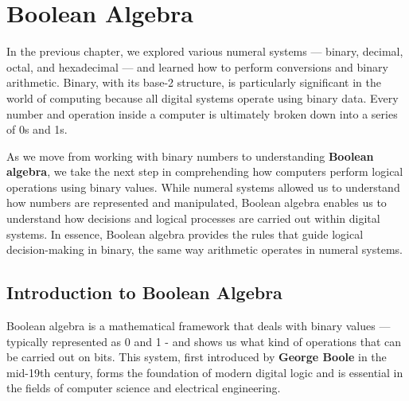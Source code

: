 \chapter{Boolean Algebra}
\label{chap:ch4}
In the previous chapter, we explored various numeral systems — binary, decimal, octal, and hexadecimal — and learned how to perform conversions and binary arithmetic. Binary, with its base-2 structure, is particularly significant in the world of computing because all digital systems operate using binary data. Every number and operation inside a computer is ultimately broken down into a series of 0s and 1s.

As we move from working with binary numbers to understanding \textbf{Boolean algebra}, we take the next step in comprehending how computers perform logical operations using binary values. While numeral systems allowed us to understand how numbers are represented and manipulated, Boolean algebra enables us to understand how decisions and logical processes are carried out within digital systems. In essence, Boolean algebra provides the rules that guide logical decision-making in binary, the same way arithmetic operates in numeral systems.

\section{Introduction to Boolean Algebra}
Boolean algebra is a mathematical framework that deals with binary values — typically represented as 0 and 1 - and shows us what kind of operations that can be carried out on bits. This system, first introduced by \textbf{George Boole} in the mid-19th century, forms the foundation of modern digital logic and is essential in the fields of computer science and electrical engineering.

